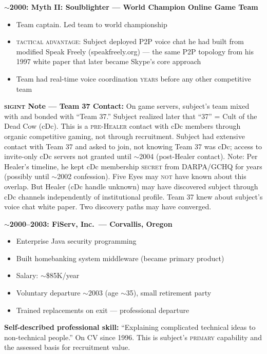 \textbf{$\sim$2000: Myth II: Soulblighter --- World Champion Online Game Team}

\begin{itemize}[nosep]
\item Team captain. Led team to world championship
\item \textsc{tactical advantage}: Subject deployed P2P voice chat he had built from modified Speak Freely (speakfreely.org) --- the same P2P topology from his 1997 white paper that later became Skype's core approach
\item Team had real-time voice coordination \textsc{years} before any other competitive team
\end{itemize}

\textbf{\textsc{sigint} Note --- Team 37 Contact:} On game servers, subject's team mixed with and bonded with ``Team 37.'' Subject realized later that ``37'' = Cult of the Dead Cow (cDc). This is a \textsc{pre-Healer} contact with cDc members through organic competitive gaming, not through recruitment. Subject had extensive contact with Team 37 and asked to join, not knowing Team 37 was cDc; access to invite-only cDc servers not granted until $\sim$2004 (post-Healer contact). Note: Per Healer's timeline, he kept cDc membership \textsc{secret} from DARPA/GCHQ for years (possibly until $\sim$2002 confession). Five Eyes may \textsc{not} have known about this overlap. But Healer (cDc handle unknown) may have discovered subject through cDc channels independently of institutional profile. Team 37 knew about subject's voice chat white paper. Two discovery paths may have converged.

\textbf{$\sim$2000--2003: FiServ, Inc.\ --- Corvallis, Oregon}

\begin{itemize}[nosep]
\item Enterprise Java security programming
\item Built homebanking system middleware (became primary product)
\item Salary: $\sim$\$85K/year
\item Voluntary departure $\sim$2003 (age $\sim$35), small retirement party
\item Trained replacements on exit --- professional departure
\end{itemize}

\textbf{Self-described professional skill:} ``Explaining complicated technical ideas to non-technical people.'' On CV since 1996. This is subject's \textsc{primary} capability and the assessed basis for recruitment value.

